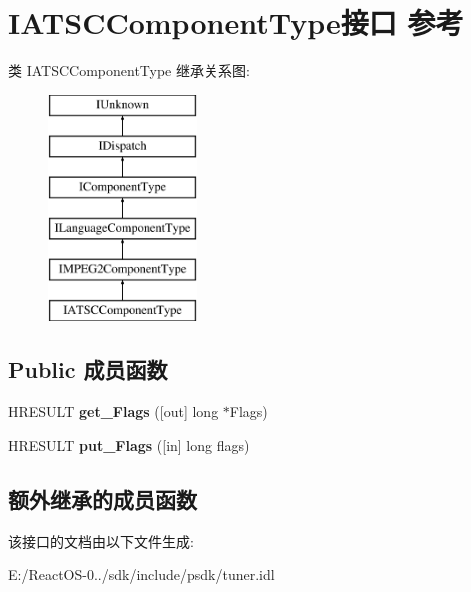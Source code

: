 \hypertarget{interface_i_a_t_s_c_component_type}{}\section{I\+A\+T\+S\+C\+Component\+Type接口 参考}
\label{interface_i_a_t_s_c_component_type}
类 I\+A\+T\+S\+C\+Component\+Type 继承关系图\+:\begin{figure}[H]
\begin{center}
\leavevmode
\includegraphics[height=6.000000cm]{interface_i_a_t_s_c_component_type}
\end{center}
\end{figure}
\subsection*{Public 成员函数}
\begin{DoxyCompactItemize}
\item 
\mbox{\label{interface_i_a_t_s_c_component_type_a5d0ccc3a9b50762bd16743938b066cee}} 
H\+R\+E\+S\+U\+LT {\bfseries get\+\_\+\+Flags} (\mbox{[}out\mbox{]} long $\ast$Flags)
\item 
\mbox{\label{interface_i_a_t_s_c_component_type_a5d655c3734a50842c85a809fa10dc225}} 
H\+R\+E\+S\+U\+LT {\bfseries put\+\_\+\+Flags} (\mbox{[}in\mbox{]} long flags)
\end{DoxyCompactItemize}
\subsection*{额外继承的成员函数}


该接口的文档由以下文件生成\+:\begin{DoxyCompactItemize}
\item 
E\+:/\+React\+O\+S-\/0../sdk/include/psdk/tuner.\+idl\end{DoxyCompactItemize}
